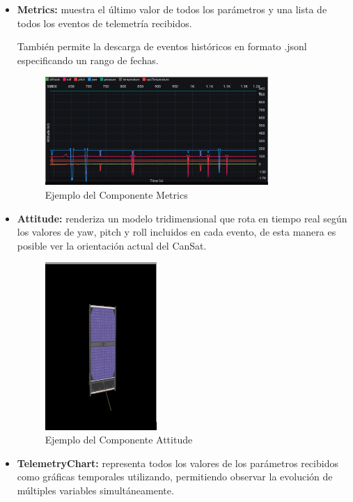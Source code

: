 \begin{itemize}
    \item \textbf{Metrics:} muestra el último valor de todos los parámetros y una lista de todos los eventos de telemetría recibidos.

    También permite la descarga de eventos históricos en formato .jsonl especificando un rango de fechas.
    \begin{figure}[H]
        \centering
        \includegraphics[width=0.8\textwidth]{Imagenes/Bitmap/metrics}
        \caption{Ejemplo del Componente Metrics}
        \label{fig:metrics}
    \end{figure}
    \item \textbf{Attitude:} renderiza un modelo tridimensional que rota en tiempo real según los valores de yaw, pitch y roll incluidos en cada evento, de esta manera es posible ver la orientación actual del CanSat.
    \begin{figure}[H]
        \centering
        \includegraphics[width=0.4\textwidth]{Imagenes/Bitmap/attitude}
        \caption{Ejemplo del Componente Attitude}
        \label{fig:attitude}
    \end{figure}
    \item \textbf{TelemetryChart:} representa todos los valores de los parámetros recibidos como gráficas temporales utilizando, permitiendo observar la evolución de múltiples variables simultáneamente.

\end{itemize}

